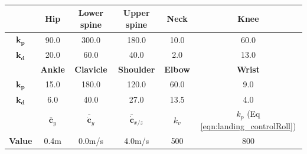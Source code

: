 \begin{table}
\center
{
\caption{
}


\begin{tabular}{|c |c|c|c|c|c| }
\hline
\label{tab:landing_tracking}

& {\small \textbf{Hip}} & {\small \textbf{Lower spine} } & {\small
  \textbf{Upper spine} } & {\small \textbf{Neck} } & {\small \textbf{Knee} } \\ \hline 
\textbf{$\boldsymbol{k_p}$} & {\small 90.0} & {\small 300.0}& {\small 180.0}&
       {\small 10.0} & {\small 60.0} \\ \hline 
\textbf{$\boldsymbol{k_d}$} & {\small 20.0} & {\small 60.0} & {\small 40.0} & {\small  2.0}
& {\small 13.0} \\

\hhline{|=|=|=|=|=|=|}

& {\small \textbf{Ankle} } & {\small \textbf{Clavicle} } & {\small
  \textbf{Shoulder}} & {\small \textbf{Elbow} } & {\small \textbf{Wrist} } \\ \hline 
\textbf{$\boldsymbol{k_p}$} & {\small 15.0} & {\small 180.0}& {\small 120.0}&
       {\small 60.0} & {\small  9.0} \\ \hline
\textbf{$\boldsymbol{k_d}$} & {\small  6.0} & {\small 40.0} & {\small 27.0} &
       {\small 13.5} & {\small  4.0} \\ 

\hhline{|=|=|=|=|=|=|}




&
{\small \textbf{$\boldsymbol{\bar{c}}_y$} } &
{\small \textbf{$\boldsymbol{\bar{\dot{c}}}_y$} } &
{\small \textbf{$\boldsymbol{\bar{\dot{c}}}_{x/z}$} } &
{\small \textbf{$k_v$} } &
{\small \textbf{$k_p$} (Eq \ref{eqn:landing_controlRoll}) }   
\\ \hline

{\small \textbf{Value}} & 
{\small 0.4m} & {\small 0.0m/s} & {\small 4.0m/s} & {\small 500} & {\small 800}
\\ \hline
\end{tabular}
}
\end{table}


